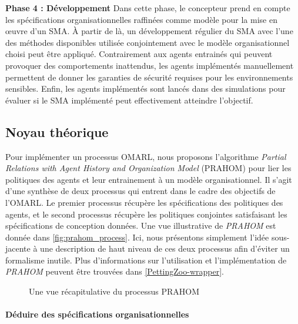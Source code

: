\documentclass[contribution]{jfsma}
\begin{document}
\textbf{Phase 4 : Développement} \quad Dans cette phase, le concepteur prend en compte les spécifications organisationnelles raffinées comme modèle pour la mise en œuvre d'un SMA. À partir de là, un développement régulier du SMA avec l'une des méthodes disponibles utilisée conjointement avec le modèle organisationnel choisi peut être appliqué. Contrairement aux agents entrainés qui peuvent provoquer des comportements inattendus, les agents implémentés manuellement permettent de donner les garanties de sécurité requises pour les environnements sensibles. Enfin, les agents implémentés sont lancés dans des simulations pour évaluer si le SMA implémenté peut effectivement atteindre l'objectif.

\subsection{Noyau théorique}

Pour implémenter un processus OMARL, nous proposons l'algorithme \emph{Partial Relations with Agent History and Organization Model} (PRAHOM) pour lier les politiques des agents et leur entrainement à un modèle organisationnel.
Il s'agit d'une synthèse de deux processus qui entrent dans le cadre des objectifs de l'OMARL. Le premier processus récupère les spécifications des politiques des agents, et le second processus récupère les politiques conjointes satisfaisant les spécifications de conception données. Une vue illustrative de \emph{PRAHOM} est donnée dans \autoref{fig:prahom_process}.
Ici, nous présentons simplement l'idée sous-jacente à une description de haut niveau de ces deux processus afin d'éviter un formalisme inutile. Plus d'informations sur l'utilisation et l'implémentation de \emph{PRAHOM} peuvent être trouvées dans \autoref{PettingZoo-wrapper}.

\begin{figure}[h!]
  \centering
  
  \caption{Une vue récapitulative du processus PRAHOM}
  \label{fig:prahom_process}
\end{figure}

\paragraph{\textbf{Déduire des spécifications organisationnelles}}
\end{document}

